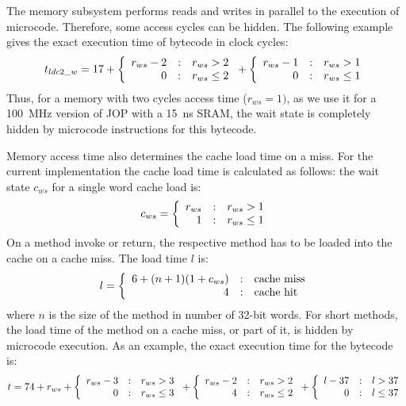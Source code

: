 The memory subsystem performs reads and writes in parallel to the
execution of microcode. Therefore, some access cycles can be hidden.
The following example gives the exact execution time of bytecode
 in clock cycles:
%
\begin{equation*}
    t_{ldc2\_w} = 17+\left\{\begin{array}{r@{\quad:\quad}l}
    r_{ws}-2 & r_{ws}>2 \\
    0   & r_{ws}\le2
    \end{array} \right.
    +
    \left\{\begin{array}{r@{\quad:\quad}l}
    r_{ws}-1 & r_{ws}>1 \\
    0   & r_{ws}\le1
    \end{array} \right.
\end{equation*}
%
Thus, for a memory with two cycles access time ($r_{ws}=1)$, as we
use it for a 100~MHz version of JOP with a 15~ns SRAM, the wait state
is completely hidden by microcode instructions for this bytecode.

Memory access time also determines the cache load time on a miss. For
the current implementation the cache load time is calculated as
follows: the wait state $c_{ws}$ for a single word cache load is:
\begin{equation*}
    c_{ws} =
    \left\{\begin{array}{r@{\quad:\quad}l}
    r_{ws} & r_{ws}>1 \\
    1   & r_{ws}\le1
    \end{array} \right.
\end{equation*}
%
On a method invoke or return, the respective method has to be loaded
into the cache on a cache miss. The load time $l$ is:
%
\[
    l =
    \left\{\begin{array}{r@{\quad:\quad}l}
    6+(n+1)(1+c_{ws}) & \mbox{cache miss} \\
    4   & \mbox{cache hit}
    \end{array} \right.
\]
where $n$ is the size of the method in number of 32-bit words. For
short methods, the load time of the method on a cache miss, or part
of it, is hidden by microcode execution. As an example, the exact
execution time for the bytecode  is:
%
\begin{equation*}
    t = 74+r_{ws}+
    \left\{\begin{array}{r@{\quad:\quad}l}
    r_{ws}-3 & r_{ws}>3 \\
    0   & r_{ws}\le3
    \end{array} \right.
    +
    \left\{\begin{array}{r@{\quad:\quad}l}
    r_{ws}-2 & r_{ws}>2 \\
    4   & r_{ws}\le2
    \end{array} \right.
    +
    \left\{\begin{array}{r@{\quad:\quad}l}
    l-37 & l>37 \\
    0   & l\le37
    \end{array} \right.
\end{equation*}
%

